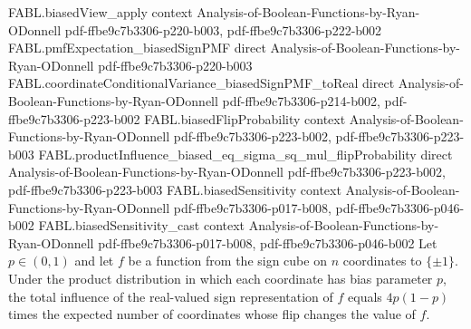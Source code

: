 \begin{theorem}
\proofstep
  {FABL.biasedView_apply}
  {context}
  {Analysis-of-Boolean-Functions-by-Ryan-ODonnell}
  {pdf-ffbe9c7b3306-p220-b003,
    pdf-ffbe9c7b3306-p222-b002}
\proofstep
  {FABL.pmfExpectation_biasedSignPMF}
  {direct}
  {Analysis-of-Boolean-Functions-by-Ryan-ODonnell}
  {pdf-ffbe9c7b3306-p220-b003}
\proofstep
  {FABL.coordinateConditionalVariance_biasedSignPMF_toReal}
  {direct}
  {Analysis-of-Boolean-Functions-by-Ryan-ODonnell}
  {pdf-ffbe9c7b3306-p214-b002,
    pdf-ffbe9c7b3306-p223-b002}
\proofstep
  {FABL.biasedFlipProbability}
  {context}
  {Analysis-of-Boolean-Functions-by-Ryan-ODonnell}
  {pdf-ffbe9c7b3306-p223-b002,
    pdf-ffbe9c7b3306-p223-b003}
\proofstep
  {FABL.productInfluence_biased_eq_sigma_sq_mul_flipProbability}
  {direct}
  {Analysis-of-Boolean-Functions-by-Ryan-ODonnell}
  {pdf-ffbe9c7b3306-p223-b002,
    pdf-ffbe9c7b3306-p223-b003}
\proofstep
  {FABL.biasedSensitivity}
  {context}
  {Analysis-of-Boolean-Functions-by-Ryan-ODonnell}
  {pdf-ffbe9c7b3306-p017-b008,
    pdf-ffbe9c7b3306-p046-b002}
\proofstep
  {FABL.biasedSensitivity_cast}
  {context}
  {Analysis-of-Boolean-Functions-by-Ryan-ODonnell}
  {pdf-ffbe9c7b3306-p017-b008,
    pdf-ffbe9c7b3306-p046-b002}
Let $p\in(0,1)$ and let $f$ be a function from the sign cube on $n$ coordinates to
$\{\pm1\}$. Under the product distribution in which each coordinate has bias
parameter $p$, the total influence of the real-valued sign representation of $f$ equals
$4p(1-p)$ times the expected number of coordinates whose flip changes the value of $f$.
\end{theorem}

